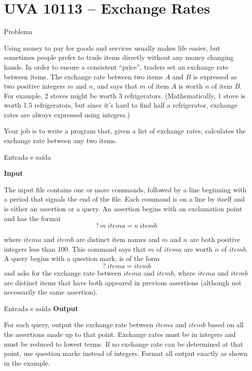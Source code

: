 \section{UVA 10113 -- Exchange Rates}

\begin{frame}[fragile]{Problema}

Using money to pay for goods and services usually makes life easier, but sometimes people prefer 
to trade items directly without any money changing hands. In order to ensure a consistent 
``price'', traders set an exchange rate between items. The exchange rate between two items $A$ and 
$B$ is expressed as two positive integers $m$ and $n$, and says that $m$ of item $A$ is worth 
$n$ of item $B$. For example, 2 stoves might be worth 3 refrigerators. (Mathematically, 1 stove 
is worth 1.5 refrigerators, but since it’s hard to find half a refrigerator, exchange rates are 
always expressed using integers.)

Your job is to write a program that, given a list of exchange rates, calculates the exchange rate
between any two items.

\end{frame}

\begin{frame}[fragile]{Entrada e saída}

\textbf{Input}

The input file contains one or more commands, followed by a line beginning with a period that 
signals the end of the file. Each command is on a line by itself and is either an assertion or a 
query. An assertion begins with an exclamation point and has the format
\[
!\ m\ itema = n\ itemb
\]

where $itema$ and $itemb$ are distinct item names and $m$ and $n$ are both positive integers less 
than 100.  This command says that $m$ of $itema$ are worth $n$ of $itemb$. A query begins with a 
question mark, is of the form
\[
?\ itema = itemb
\]
and asks for the exchange rate between $itema$ and $itemb$, where $itema$ and $itemb$ are distinct 
items that have both appeared in previous assertions (although not necessarily the same assertion).
\end{frame}

\begin{frame}[fragile]{Entrada e saída}
\textbf{Output}

For each query, output the exchange rate between $itema$ and $itemb$ based on all the assertions made 
up to that point. Exchange rates must be in integers and must be reduced to lowest terms. If no 
exchange rate can be determined at that point, use question marks instead of integers. Format all 
output exactly as shown in the example.
\end{frame}

